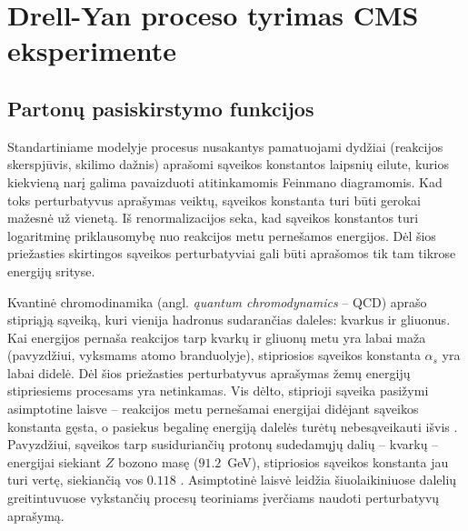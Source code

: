 \documentclass[a4paper, 12pt, oneside]{article}
\begin{document}
\section{Drell-Yan proceso tyrimas CMS eksperimente}


\subsection{Partonų pasiskirstymo funkcijos}
Standartiniame modelyje procesus nusakantys pamatuojami dydžiai (reakcijos skerspjūvis, skilimo dažnis) aprašomi sąveikos
konstantos laipsnių eilute, kurios kiekvieną narį galima pavaizduoti atitinkamomis Feinmano diagramomis.
Kad toks perturbatyvus aprašymas veiktų, sąveikos konstanta turi būti gerokai mažesnė už vienetą.
Iš renormalizacijos seka, kad sąveikos konstantos turi logaritminę priklausomybę nuo reakcijos metu pernešamos energijos.
Dėl šios priežasties skirtingos sąveikos perturbatyviai gali būti aprašomos tik tam tikrose energijų srityse\cite{QCDalpha}.

Kvantinė chromodinamika (angl. \textit{ąuantum chromodynamics} -- QCD) aprašo stipriąją sąveiką, kuri vienija hadronus
sudarančias daleles: kvarkus ir gliuonus.
Kai energijos pernaša reakcijos tarp kvarkų ir gliuonų metu yra labai maža (pavyzdžiui, vyksmams atomo branduolyje),
stipriosios sąveikos konstanta $\alpha_s$ yra labai didelė.
Dėl šios priežasties perturbatyvus aprašymas žemų energijų stipriesiems procesams yra netinkamas.
Vis dėlto, stiprioji sąveika pasižymi asimptotine laisve -- reakcijos metu pernešamai energijai didėjant sąveikos konstanta
gęsta, o pasiekus begalinę energiją dalelės turėtų nebesąveikauti išvis \cite{AFreedom}.
Pavyzdžiui, sąveikos tarp susiduriančių protonų sudedamųjų dalių -- kvarkų -- energijai siekiant $Z$ bozono masę ($91.2$~GeV),
stipriosios sąveikos konstanta jau turi vertę, siekiančią vos $0.118$ \cite{PDGreview}.
Asimptotinė laisvė leidžia šiuolaikiniuose dalelių greitintuvuose vykstančių procesų teoriniams įverčiams naudoti
perturbatyvų aprašymą.
\end{document}

